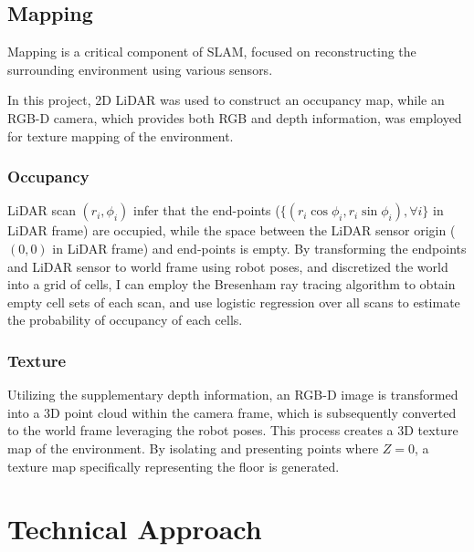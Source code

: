 \documentclass[conference]{IEEEtran}
\begin{document}
\subsection{Mapping}
Mapping is a critical component of SLAM, 
focused on reconstructing the surrounding environment using various sensors.

In this project, 2D LiDAR was used to construct an occupancy map, 
while an RGB-D camera, which provides both RGB and depth information,
was employed for texture mapping of the environment.

\subsubsection{Occupancy}
LiDAR scan $(r_i, \phi_i)$ infer that 
the end-points ($\{(r_i\cos\phi_i, r_i\sin\phi_i), \forall i\}$ in LiDAR frame) are occupied,
while the space between the LiDAR sensor origin ($(0, 0)$ in LiDAR frame) and 
end-points is empty.
By transforming the endpoints and LiDAR sensor to world frame using robot poses,
and discretized the world into a grid of cells,
I can employ the Bresenham ray tracing algorithm to obtain empty cell sets of each scan,
and use logistic regression over all scans to estimate the probability of occupancy of each cells.

\subsubsection{Texture}
Utilizing the supplementary depth information, 
an RGB-D image is transformed into a 3D point cloud within the camera frame, 
which is subsequently converted to the world frame leveraging the robot poses. 
This process creates a 3D texture map of the environment. 
By isolating and presenting points where $Z=0$, 
a texture map specifically representing the floor is generated.

\section{Technical Approach}
\end{document}
